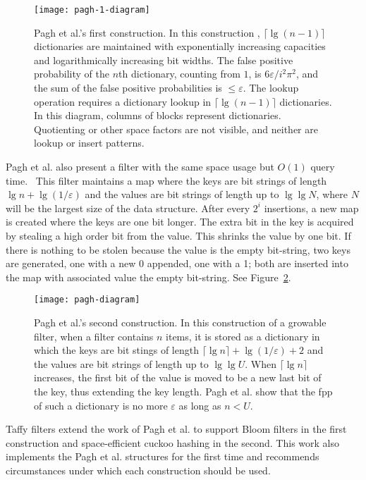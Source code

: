 \documentclass[sigconf, nonacm]{acmart}
\begin{document}
\begin{figure}
\texttt{[image: pagh-1-diagram]}
\caption{\label{pagh-1-diagram}
Pagh et al.'s first construction.
In this construction , $\lceil\lg (n-1) \rceil$ dictionaries are maintained with exponentially increasing capacities and logarithmically increasing bit widths.
The false positive probability of the $n$th dictionary, counting from $1$, is $6 \varepsilon / i^2 \pi^2$, and the sum of the false positive probabilities is $\le \varepsilon$.
The lookup operation requires a dictionary lookup in $\lceil\lg(n-1)\rceil$ dictionaries.\\
In this diagram, columns of blocks represent dictionaries.
Quotienting or other space factors are not visible, and neither are lookup or insert patterns.
}
\end{figure}

Pagh et al. also present a filter with the same space usage but $O(1)$ query time.~\cite{psw}
This filter maintains a map where the keys are bit strings of length $\lg n + \lg (1/\varepsilon)$ and the values are bit strings of length up to $\lg \lg N$, where $N$ will be the largest size of the data structure.
After every $2^i$ insertions, a new map is created where the keys are one bit longer.
The extra bit in the key is acquired by stealing a high order bit from the value.
This shrinks the value by one bit.
If there is nothing to be stolen because the value is the empty bit-string, two keys are generated, one with a new 0 appended, one with a 1; both are inserted into the map with associated value the empty bit-string.
See Figure~\ref{pagh-diagram}.

\begin{figure}
\texttt{[image: pagh-diagram]}
\caption{\label{pagh-diagram}
Pagh et al.'s second construction.
In this construction of a growable filter, when a filter contains $n$ items, it is stored as a dictionary in which the keys are bit stings of length $\lceil \lg n \rceil + \lg (1/\varepsilon) + 2$ and the values are bit strings of length up to $\lg \lg U$.
When $\lceil \lg n \rceil$ increases, the first bit of the value is moved to be a new last bit of the key, thus extending the key length.
Pagh et al. show that the fpp of such a dictionary is no more $\varepsilon$ as long as $n < U$.
}
\end{figure}

Taffy filters extend the work of Pagh et al. to support Bloom filters in the first construction and space-efficient cuckoo hashing in the second.
This work also implements the Pagh et al. structures for the first time and recommends circumstances under which each construction should be used.
\end{document}

